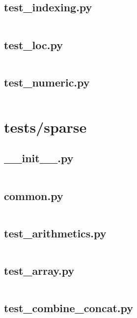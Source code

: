 \documentclass{article}
\begin{document}
\subsection{test\_indexing.py}
\inputminted{python}{/home/dufferzafar/dev/@clones/pandas/pandas/tests/series/indexing/test_indexing.py}
\newpage

\subsection{test\_loc.py}
\inputminted{python}{/home/dufferzafar/dev/@clones/pandas/pandas/tests/series/indexing/test_loc.py}
\newpage

\subsection{test\_numeric.py}
\inputminted{python}{/home/dufferzafar/dev/@clones/pandas/pandas/tests/series/indexing/test_numeric.py}
\newpage

\section{tests/sparse}

\subsection{\_\_init\_\_.py}
\inputminted{python}{/home/dufferzafar/dev/@clones/pandas/pandas/tests/sparse/__init__.py}
\newpage

\subsection{common.py}
\inputminted{python}{/home/dufferzafar/dev/@clones/pandas/pandas/tests/sparse/common.py}
\newpage

\subsection{test\_arithmetics.py}
\inputminted{python}{/home/dufferzafar/dev/@clones/pandas/pandas/tests/sparse/test_arithmetics.py}
\newpage

\subsection{test\_array.py}
\inputminted{python}{/home/dufferzafar/dev/@clones/pandas/pandas/tests/sparse/test_array.py}
\newpage

\subsection{test\_combine\_concat.py}
\inputminted{python}{/home/dufferzafar/dev/@clones/pandas/pandas/tests/sparse/test_combine_concat.py}
\newpage
\end{document}
